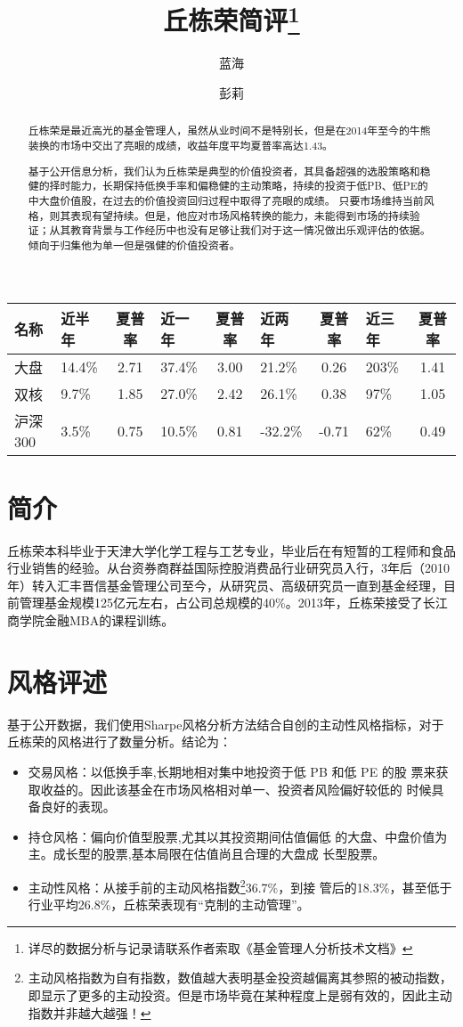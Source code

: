 \documentclass[journal=jacsat,manuscript=article]{achemso}
\author{蓝海}
\author{彭莉}
\title[丘栋荣]{丘栋荣简评\footnote{详尽的数据分析与记录请联系作者索取《基金管理人分析技术文档》}}
\begin{document}
\begin{abstract}
丘栋荣是最近高光的基金管理人，虽然从业时间不是特别长，但是在2014年至今的牛熊装换的市场中交出了亮眼的成绩，收益年度平均夏普率高达1.43。

基于公开信息分析，我们认为丘栋荣是典型的价值投资者，其具备超强的选股策略和稳健的择时能力，长期保持低换手率和偏稳健的主动策略，持续的投资于低PB、低PE的中大盘价值股，在过去的价值投资回归过程中取得了亮眼的成绩。
只要市场维持当前风格，则其表现有望持续。但是，他应对市场风格转换的能力，未能得到市场的持续验证；从其教育背景与工作经历中也没有足够让我们对于这一情况做出乐观评估的依据。倾向于归集他为单一但是强健的价值投资者。
\end{abstract}
\begin{longtable}[]{@{}llclclclc@{}}
\toprule
名称 & 近半年 & 夏普率 & 近一年 & 夏普率 & 近两年 & 夏普率 & 近三年 &
夏普率\tabularnewline
\midrule
\endhead
大盘 & 14.4\% & 2.71 & 37.4\% & 3.00 & 21.2\% & 0.26 & 203\% &
1.41\tabularnewline
双核 & 9.7\% & 1.85 & 27.0\% & 2.42 & 26.1\% & 0.38 & 97\% &
1.05\tabularnewline
沪深300 & 3.5\% & 0.75 & 10.5\% & 0.81 & -32.2\% & -0.71 & 62\% &
0.49\tabularnewline
\bottomrule
\end{longtable}

\section{简介}

丘栋荣本科毕业于天津大学化学工程与工艺专业，毕业后在有短暂的工程师和食品行业销售的经验。从台资券商群益国际控股消费品行业研究员入行，3年后（2010年）转入汇丰晋信基金管理公司至今，从研究员、高级研究员一直到基金经理，目前管理基金规模125亿元左右，占公司总规模的40\%。2013年，丘栋荣接受了长江商学院金融MBA的课程训练。

\section{风格评述}

基于公开数据，我们使用Sharpe风格分析方法结合自创的主动性风格指标，对于丘栋荣的风格进行了数量分析。结论为：

\begin{itemize}
\item 交易风格：以低换手率,长期地相对集中地投资于低 PB 和低 PE 的股
票来获取收益的。因此该基金在市场风格相对单一、投资者风险偏好较低的
时候具备良好的表现。
\item 持仓风格：偏向价值型股票,尤其以其投资期间估值偏低
的大盘、中盘价值为主。成长型的股票,基本局限在估值尚且合理的大盘成
长型股票。
\item 主动性风格：从接手前的主动风格指数\footnote{主动风格指数为自有指数，数值越大表明基金投资越偏离其参照的被动指数，即显示了更多的主动投资。但是市场毕竟在某种程度上是弱有效的，因此主动指数并非越大越强！}36.7\%，到接
管后的18.3\%，甚至低于行业平均26.8\%，丘栋荣表现有“克制的主动管理”。
\end{itemize}
\end{document}
